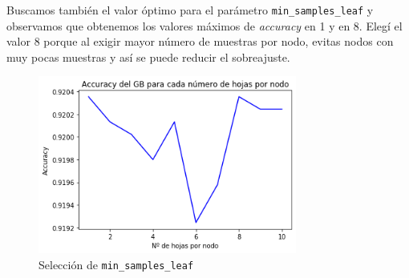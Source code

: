 \documentclass[a4]{article}
\begin{document}
\begin{figure}[H]
  \centering
\end{figure}

\newpage
Buscamos también el valor óptimo para el parámetro \texttt{min\_samples\_leaf} y observamos que obtenemos los valores máximos de \textit{accuracy} en 1 y en 8. Elegí el valor 8 porque al exigir mayor número de muestras por nodo, evitas nodos con muy pocas muestras y así se puede reducir el sobreajuste.

\begin{figure}[H]
  \centering
  \caption{Selección de \texttt{min\_samples\_leaf}}
  \includegraphics[width=85mm]{imagenes/p3_06_n_hojas}
\end{figure}
\end{document}
